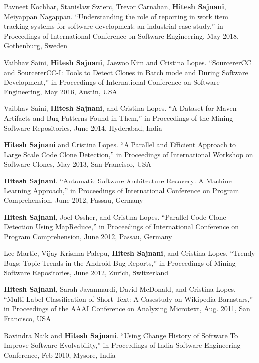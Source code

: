 \documentclass[letterpaper,11pt]{article}
\begin{document}
\begin{etaremune}
\item\small{Pavneet Kochhar, Stanislaw Swierc, Trevor Carnahan, \textbf{Hitesh Sajnani}, Meiyappan Nagappan. “Understanding the role of reporting in work item tracking systems for software development: an industrial case study,” in Proceedings of International Conference on Software Engineering, May 2018, Gothenburg, Sweden  }

 \item\small{Vaibhav Saini, \textbf{Hitesh Sajnani}, Jaewoo Kim and Cristina Lopes. “SourcererCC and
SourcererCC-I: Tools to Detect Clones in Batch mode and During Software Development,”
in Proceedings of International Conference on Software Engineering, May 2016,
Austin, USA }

 \item\small{Vaibhav Saini, \textbf{Hitesh Sajnani}, and Cristina Lopes. “A Dataset for Maven Artifacts and
Bug Patterns Found in Them,” in Proceedings of the Mining Software Repositories, June
2014, Hyderabad, India }

\item\small{\textbf{Hitesh Sajnani} and Cristina Lopes. “A Parallel and Efficient Approach to Large Scale
Code Clone Detection,” in Proceedings of International Workshop on Software Clones,
May 2013, San Francisco, USA }

\item\small{\textbf{Hitesh Sajnani}. “Automatic Software Architecture Recovery: A Machine Learning
Approach,” in Proceedings of International Conference on Program Comprehension, June
2012, Passau, Germany }

 \item\small{\textbf{Hitesh Sajnani}, Joel Ossher, and Cristina Lopes. “Parallel Code Clone Detection Using
MapReduce,” in Proceedings of International Conference on Program Comprehension, June
2012, Passau, Germany }

\item\small{Lee Martie, Vijay Krishna Palepu, \textbf{Hitesh Sajnani}, and Cristina Lopes. “Trendy Bugs: Topic
Trends in the Android Bug Reports,” in Proceedings of Mining Software Repositories,
June 2012, Zurich, Switzerland }

\item\small{\textbf{Hitesh Sajnani}, Sarah Javanmardi, David McDonald, and Cristina Lopes. “Multi-Label
Classification of Short Text: A Casestudy on Wikipedia Barnstars,” in Proceedings of the AAAI Conference on Analyzing Microtext, Aug. 2011, San Francisco, USA}

\item\small{Ravindra Naik and \textbf{Hitesh Sajnani}. “Using Change History of Software To Improve
Software Evolvability,” in Proceedings of India Software Engineering Conference, Feb 2010, Mysore, India}

\end{etaremune}
\end{document}
